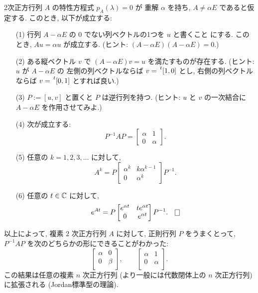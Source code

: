 \documentclass[12pt,twoside]{jarticle}
\begin{document}
\begin{question}[15点]
  \label{q:normal-form-2.2}
  2次正方行列 $A$ の特性方程式 $p_A(\lambda)=0$ が
  重解 $\alpha$ を持ち,  $A \ne \alpha E$ であると仮定する.
  このとき, 以下が成立する:
  \begin{enumerate}
  \item[(1)] 行列 $A - \alpha E$ の $0$ でない列ベクトルの1つを $u$ と書くこと
    にする. このとき, $Au = \alpha u$ が成立する. 
    (ヒント: $(A-\alpha E)(A-\alpha E)=0$.)
  \item[(2)] ある縦ベクトル $v$ で $(A - \alpha E)v=u$ を満たすものが存在する.
    (ヒント: $u$ が $A - \alpha E$ の
    左側の列ベクトルならば $v=\tp{[1, 0]}$ とし, 
    右側の列ベクトルならば $v=\tp{[0, 1]}$ とすれば良い.)
  \item[(3)] $P := [u, v]$ と置くと $P$ は逆行列を持つ.
    (ヒント: $u$ と $v$ の一次結合に $A - \alpha E$ を作用させてみよ.)
  \item[(4)] 次が成立する:
    \begin{equation*}
      P^{-1} A P = \begin{bmatrix}\alpha & 1\\0 & \alpha\end{bmatrix}.
    \end{equation*}
  \item[(5)] 任意の $k=1,2,3,\ldots$ に対して,
    \begin{equation*}
      A^k = 
      P
      \begin{bmatrix} \alpha^k & k\alpha^{k-1} \\ 0 & \alpha^k \end{bmatrix}
      P^{-1}. 
    \end{equation*}
  \item[(6)] 任意の $t\in{\mathbb C}$ に対して,
    \begin{equation*}
      e^{At} =
      P
      \begin{bmatrix}
        e^{\alpha t} & t e^{\alpha t} \\
        0            &   e^{\alpha t} \\
      \end{bmatrix}
      P^{-1}.
    \qed
    \end{equation*}
  \end{enumerate}
\end{question}

以上によって, 複素 $2$ 次正方行列 $A$ に対して, 正則行列 $P$ をうまくとって,
$P^{-1}AP$ を次のどちらかの形にできることがわかった:
\begin{equation*}
  \begin{bmatrix} \alpha & 0 \\ 0 & \beta \\ \end{bmatrix},
  \qquad
  \begin{bmatrix} \alpha & 1 \\ 0 & \alpha \\ \end{bmatrix}.
\end{equation*}
この結果は任意の複素 $n$ 次正方行列 (より一般には代数閉体上の $n$ 次正方行列) 
に拡張される (Jordan標準型の理論).
\end{document}
